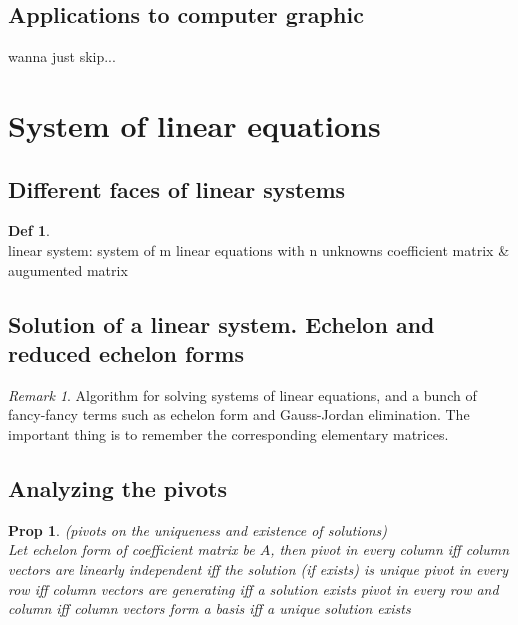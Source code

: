 \documentclass[hidelinks]{article}
\theoremstyle{definition}
\newtheorem*{defin}{Def}
\theoremstyle{plain}
\newtheorem{proposition}[theorem]{Prop}
\theoremstyle{remark}
\newtheorem*{remark}{Remark}
\begin{document}
\subsection{Applications to computer graphic}
wanna just skip...



\section{System of linear equations}

\subsection{Different faces of linear systems}
\begin{defin}~\\
linear system: system of m linear equations with n unknowns \newline
coefficient matrix \& augumented matrix
\end{defin}

\subsection{Solution of a linear system. Echelon and reduced echelon forms}

\begin{remark}
Algorithm for solving systems of linear equations, and a bunch of fancy-fancy terms such as echelon form and Gauss-Jordan elimination. The important thing is to remember the corresponding elementary matrices.
\end{remark}

\subsection{Analyzing the pivots}

\begin{proposition}\label{Prop 2.1} (pivots on the uniqueness and existence of solutions)~\\
Let echelon form of coefficient matrix be $A$, then \newline
\indent pivot in every column iff column vectors are linearly independent iff the solution (if exists) is unique \newline
\indent pivot in every row iff column vectors are generating iff a solution exists\newline
\indent pivot in every row and column iff column vectors form a basis iff a unique solution exists
\end{proposition}
\end{document}
